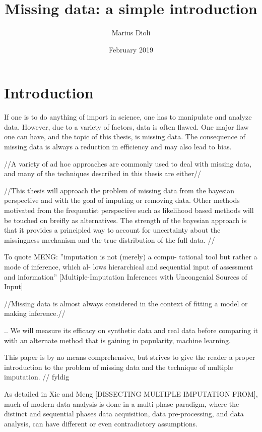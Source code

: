 \documentclass{article}
\title{Missing data: a simple introduction}
\author{Marius Dioli}
\date{February 2019}
\begin{document}
	
	\maketitle
	
	
	\section{Introduction}
	If one is to do anything of import in science, one has to manipulate and analyze data. However, due to a variety of factors, data is often flawed. One major flaw one can have, and the topic of this thesis, is missing data. The consequence of missing data is always a reduction in efficiency and may also lead to bias.
	
	//A variety of ad hoc approaches are commonly used to deal with missing data, and many of the techniques described in this thesis are either//
	
	//This thesis will approach the problem of missing data from the bayesian perspective and with the goal of imputing or removing data. Other methods motivated from the frequentist perspective such as likelihood based methods will be touched on breifly as alternatives. The strength of the bayesian approach is that it provides a principled way to account for uncertainty about the missingness mechanism and the true distribution of the full data. //
	
	To quote MENG: ''imputation is not (merely) a compu-
	tational tool but rather a mode of inference, which al-
	lows hierarchical and sequential input of assessment
	and information'' [Multiple-Imputation Inferences with Uncongenial Sources of Input]
	
	
	//Missing data is almost always considered in the context of fitting a model or making inference.//
	
	.. We will measure its efficacy on synthetic data and real data before comparing it with an alternate method that is gaining in popularity, machine learning.
	
	This paper is by no means comprehensive, but strives to give the reader a proper introduction to the problem of missing data and the technique of multiple imputation.
	// fyldig
	
	As detailed in Xie and Meng [DISSECTING MULTIPLE IMPUTATION FROM], much of modern data analysis is done in a multi-phase paradigm, where the distinct and sequential phases data acquisition, data pre-processing, and data analysis, can have different or even contradictory assumptions.
	
\end{document}
